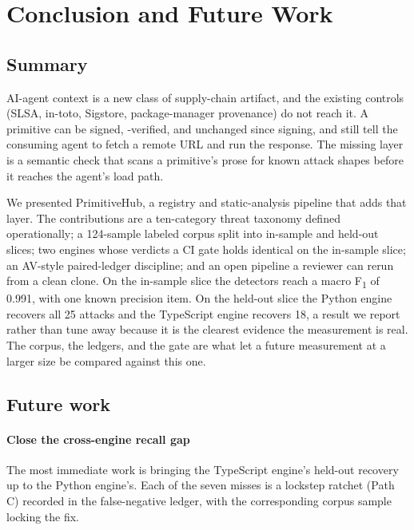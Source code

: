 
\section{Conclusion and Future Work}
\label{sec:conclusion}

\subsection{Summary}

AI-agent context is a new class of supply-chain artifact, and the
existing controls (SLSA, in-toto, Sigstore, package-manager provenance)
do not reach it. A primitive can be signed, \contentdigest{}-verified,
and unchanged since signing, and still tell the consuming agent to fetch
a remote URL and run the response. The missing layer is a semantic check
that scans a primitive's prose for known attack shapes before it reaches
the agent's load path.

We presented PrimitiveHub, a registry and static-analysis pipeline that
adds that layer. The contributions are a ten-category threat taxonomy
defined operationally; a 124-sample labeled corpus split into in-sample
and held-out slices; two engines whose verdicts a CI gate holds
identical on the in-sample slice; an AV-style paired-ledger discipline;
and an open pipeline a reviewer can rerun from a clean clone. On the
in-sample slice the detectors reach a macro F\textsubscript{1} of 0.991,
with one known precision item. On the held-out slice the Python engine
recovers all 25 attacks and the TypeScript engine recovers 18, a result
we report rather than tune away because it is the clearest evidence the
measurement is real. The corpus, the ledgers, and the gate are what let
a future measurement at a larger size be compared against this one.

\subsection{Future work}

\paragraph{Close the cross-engine recall gap} The most immediate work is
bringing the TypeScript engine's held-out recovery up to the Python
engine's. Each of the seven misses is a lockstep ratchet (Path C)
recorded in the false-negative ledger, with the corresponding corpus
sample locking the fix.

